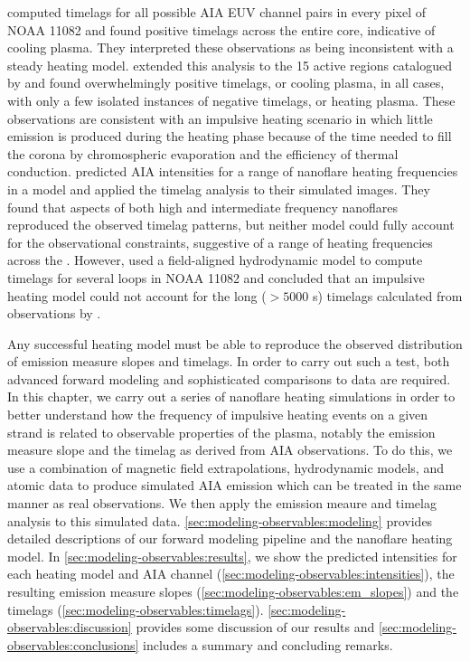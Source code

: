 \citet{viall_evidence_2012} computed timelags for all possible AIA EUV channel pairs in every pixel of \AR{} NOAA 11082 and found positive timelags across the entire \AR{} core, indicative of cooling plasma. They interpreted these observations as being inconsistent with a steady heating model. \citet{viall_survey_2017} extended this analysis to the 15 active regions catalogued by \citet{warren_systematic_2012} and found overwhelmingly positive timelags, or cooling plasma, in all cases, with only a few isolated instances of negative timelags, or heating plasma. These observations are consistent with an impulsive heating scenario in which little emission is produced during the heating phase because of the time needed to fill the corona by chromospheric evaporation and the efficiency of thermal conduction. \citet{bradshaw_patterns_2016} predicted AIA intensities for a range of nanoflare heating frequencies in a model \AR{} and applied the timelag analysis to their simulated images. They found that aspects of both high and intermediate frequency nanoflares reproduced the observed timelag patterns, but neither model could fully account for the observational constraints, suggestive of a range of heating frequencies across the \AR{}. However, \citet{lionello_can_2016} used a field-aligned hydrodynamic model to compute timelags for several loops in NOAA 11082 and concluded that an impulsive heating model could not account for the long ($>5000$ s) timelags calculated from observations by \citet{viall_evidence_2012}.

Any successful heating model must be able to reproduce the observed distribution of emission measure slopes and timelags. In order to carry out such a test, both advanced forward modeling and sophisticated comparisons to data are required. In this chapter, we carry out a series of nanoflare heating simulations in order to better understand how the frequency of impulsive heating events on a given strand is related to observable properties of the plasma, notably the emission measure slope and the timelag as derived from AIA observations. To do this, we use a combination of magnetic field extrapolations, hydrodynamic models, and atomic data to produce simulated AIA emission which can be treated in the same manner as real observations. We then apply the emission meaure and timelag analysis to this simulated data. \autoref{sec:modeling-observables:modeling} provides detailed descriptions of our forward modeling pipeline and the nanoflare heating model. In \autoref{sec:modeling-observables:results}, we show the predicted intensities for each heating model and AIA channel (\autoref{sec:modeling-observables:intensities}), the resulting emission measure slopes (\autoref{sec:modeling-observables:em_slopes}) and the timelags (\autoref{sec:modeling-observables:timelags}). \autoref{sec:modeling-observables:discussion} provides some discussion of our results and \autoref{sec:modeling-observables:conclusions} includes a summary and concluding remarks.

